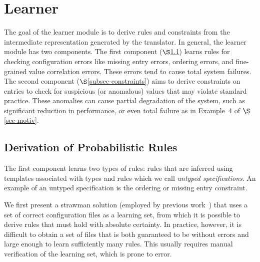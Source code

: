 \section{Learner}
\label{sec-learn}


The goal of the learner module is to derive rules and constraints from
the intermediate representation generated by the translator.
In general, the learner module has two components.
The first component ($\S$\ref{subsec-rules}) 
learns rules for checking configuration errors like
missing entry errors, ordering errors, and fine-grained value correlation errors. 
These errors tend to cause total system failures.
The second component ($\S$\ref{subsec-constraints}) 
aims to derive 
constraints on entries to check for suspicious (or anomalous) values 
that may violate standard practice. These anomalies can cause partial 
degradation of the system, 
such as significant reduction in performance, or even 
total failure as in Example~4 of $\S$\ref{sec-motiv}.

\subsection{Derivation of Probabilistic Rules}
\label{subsec-rules}

The first component learns two types of rules: rules that are inferred using templates associated with types 
and rules which we call \emph{untyped specifications}. An example of an
untyped specification is the ordering or missing entry constraint.

We first present a strawman solution (employed by
previous work~\cite{santolucitoCAV}) that uses 
a set of correct configuration files as a learning set, 
from which it is possible to derive rules 
that must hold with absolute certainty. 
In practice, however, it is difficult to obtain a set of files 
that is both guaranteed to be without errors
and large enough to learn sufficiently many rules.
This usually requires manual verification of the learning set, 
which is prone to error.

